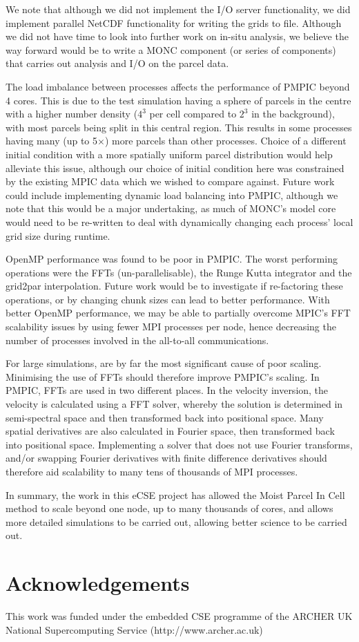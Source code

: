 \documentclass{article}
\begin{document}
We note that although we did not implement the I/O server functionality, we did implement parallel NetCDF functionality for writing the grids to file. Although we did not have time to look into further work on in-situ analysis, we believe the way forward would be to write a MONC component (or series of components) that carries out analysis and I/O on the parcel data.

The load imbalance between processes affects the performance of PMPIC beyond 4 cores. This is due to the test simulation having a sphere of parcels in the centre with a higher number density ($4^3$ per cell compared to $2^3$ in the background), with most parcels being split in this central region. This results in some processes having many (up to 5$\times$) more parcels than other processes. Choice of a different initial condition with a more spatially uniform parcel distribution would help alleviate this issue, although our choice of initial condition here was constrained by the existing MPIC data which we wished to compare against. Future work could include implementing dynamic load balancing into PMPIC, although we note that this would be a major undertaking, as much of MONC's model core would need to be re-written to deal with dynamically changing each process' local grid size during runtime.

OpenMP performance was found to be poor in PMPIC. The worst performing operations were the FFTs (un-parallelisable), the Runge Kutta integrator and the grid2par interpolation. Future work would be to investigate if re-factoring these operations, or by changing chunk sizes can lead to better performance. With better OpenMP performance, we may be able to partially overcome MPIC's FFT scalability issues by using fewer MPI processes per node, hence decreasing the number of processes involved in the all-to-all communications.

For large simulations, are by far the most significant cause of poor scaling. Minimising the use of FFTs should therefore improve PMPIC's scaling. In PMPIC, FFTs are used in two different places. In the velocity inversion, the velocity is calculated using a FFT solver, whereby the solution is determined in semi-spectral space and then transformed back into positional space. Many spatial derivatives are also calculated in Fourier space, then transformed back into positional space. Implementing a solver that does not use Fourier transforms, and/or swapping Fourier derivatives with finite difference derivatives should therefore aid scalability to many tens of thousands of MPI processes.

In summary, the work in this eCSE project has allowed the Moist Parcel In Cell method to scale beyond one node, up to many thousands of cores, and allows more detailed simulations to be carried out, allowing better science to be carried out.


\section*{Acknowledgements}
This work was funded under the embedded CSE programme of the ARCHER UK National Supercomputing Service (http://www.archer.ac.uk)




\end{document}
